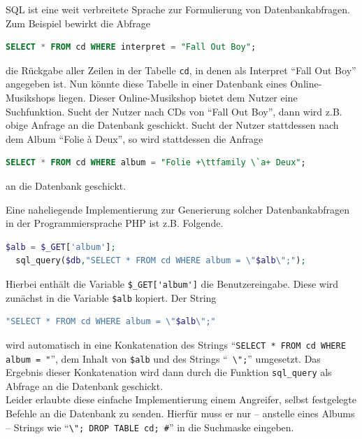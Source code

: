 SQL ist eine weit verbreitete Sprache zur Formulierung von Datenbankabfragen. Zum Beispiel bewirkt die Abfrage
\begin{lstlisting}[language=SQL]
  SELECT * FROM cd WHERE interpret = "Fall Out Boy";
\end{lstlisting}

die Rückgabe aller Zeilen in der Tabelle \lstinline+cd+, in denen als Interpret "`Fall Out Boy"' angegeben ist.
Nun könnte diese Tabelle in einer Datenbank eines Online-Musikshops liegen. Dieser Online-Musikshop bietet dem Nutzer eine Suchfunktion.
Sucht der Nutzer nach CDs von "`Fall Out Boy"', dann wird z.B. obige Anfrage an die Datenbank geschickt.
Sucht der Nutzer stattdessen nach dem Album "`Folie \`a Deux"', so wird stattdessen die Anfrage 

\begin{lstlisting}[language=SQL,escapechar=+]
  SELECT * FROM cd WHERE album = "Folie +\ttfamily \`a+ Deux";
\end{lstlisting}

an die Datenbank geschickt.

Eine naheliegende Implementierung zur Generierung solcher Datenbankabfragen in der Programmiersprache PHP ist z.B. Folgende.

\begin{lstlisting}[language=PHP]
  $alb = $_GET['album'];
  sql_query($db,"SELECT * FROM cd WHERE album = \"$alb\";");
\end{lstlisting}
\label{listing:impl:SqlInjectionInPhp}

Hierbei enthält die Variable \lstinline+$_GET['album']+ die Benutzereingabe. Diese wird zunächst in die Variable \lstinline+$alb+ kopiert. Der String

\begin{lstlisting}[language=PHP]
	"SELECT * FROM cd WHERE album = \"$alb\";"
\end{lstlisting}

wird automatisch in eine Konkatenation des Strings "`\lstinline+SELECT * FROM cd WHERE album = "+"', dem Inhalt von \lstinline+$alb+  und des Strings "`\lstinline+ \";+"' umgesetzt.
Das Ergebnis dieser Konkatenation wird dann durch die Funktion \lstinline+sql_query+ als Abfrage an die Datenbank geschickt.\\

Leider erlaubte diese einfache Implementierung einem Angreifer, selbst festgelegte Befehle an die Datenbank zu senden. Hierfür muss er nur -- anstelle eines Albums -- Strings wie "`\lstinline+\"; DROP TABLE cd; #+"' in die Suchmaske eingeben.

